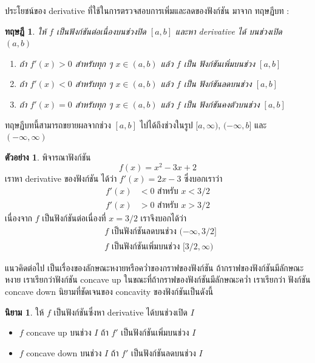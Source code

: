 \documentclass[
]{book}
\newtheorem{theorem}{ทฤษฎี}[chapter]
\theoremstyle{definition}
\newtheorem{definition}{นิยาม}[chapter]
\theoremstyle{definition}
\newtheorem{example}{ตัวอย่าง}[chapter]
\theoremstyle{definition}
\theoremstyle{definition}
\theoremstyle{remark}
\begin{document}
ประโยชน์ของ derivative ที่ใช้ในการตรวจสอบการเพิ่มและลดของฟังก์ชัน มาจาก ทฤษฏีบท :

\begin{theorem}

ให้ \(f\) เป็นฟังก์ชันต่อเนื่องบนช่วงปิด \([a,b]\) และหา derivative ได้ บนช่วงเปิด
\((a,b)\)

\begin{enumerate}
\def\labelenumi{\arabic{enumi}.}
\item
  ถ้า \(f'(x) > 0\) สำหรับทุก ๆ \(x \in (a,b)\) แล้ว \(f\) เป็น ฟังก์ชันเพิ่มบนช่วง
  \([a,b]\)
\item
  ถ้า \(f'(x) < 0\) สำหรับทุก ๆ \(x \in (a,b)\) แล้ว \(f\) เป็น ฟังก์ชันลดบนช่วง
  \([a,b]\)
\item
  ถ้า \(f'(x) = 0\) สำหรับทุก ๆ \(x \in (a,b)\) แล้ว \(f\) เป็น ฟังก์ชันคงตัวบนช่วง
  \([a,b]\)
\end{enumerate}

\end{theorem}

ทฤษฏีบทนี้สามารถขยายผลจากช่วง \([a,b]\) ไปได้ถึงช่วงในรูป \([a,\infty)\),
\((-\infty,b]\) และ \((-\infty,\infty)\)

\begin{example}
พิจารณาฟังก์ชัน \[f(x) = x^2-3x+2\] เราหา derivative ของฟังก์ชัน ได้ว่า
\(f'(x) = 2x-3\) ซึ่งบอกเราว่า \begin{equation}   \begin{aligned}
    f'(x) &< 0 \text{ สำหรับ $x < 3/2$} \\
    f'(x) &> 0 \text{ สำหรับ $x > 3/2$}
  \end{aligned} \end{equation} เนื่องจาก \(f\) เป็นฟังก์ชันต่อเนื่องที่ \(x=3/2\)
เราจึงบอกได้ว่า \begin{equation}   \begin{aligned}
    \text{ $f$ เป็นฟังก์ชันลดบนช่วง $(-\infty,3/2]$} \\
    \text{ $f$ เป็นฟังก์ชันเพิ่มบนช่วง $[3/2,\infty)$}
  \end{aligned} \end{equation}
\end{example}

แนวคิดต่อไป เป็นเรื่องของลักษณะหงายหรือคว่ำของกราฟของฟังก์ชัน
ถ้ากราฟของฟังก์ชันมีลักษณะหงาย เราเรียกว่าฟังก์ชัน concave up
ในขณะที่ถ้ากราฟของฟังก์ชันมีลักษณะคว่ำ เราเรียกว่า ฟังก์ชัน concave down นิยามที่ชัดเจนของ
concavity ของฟังก์ชันเป็นดังนี้

\begin{definition}

ให้ \(f\) เป็นฟังก์ชันซึ่งหา derivative ได้บนช่วงเปิด \(I\)

\begin{itemize}
\item
  \(f\) concave up บนช่วง \(I\) ถ้า \(f'\) เป็นฟังก์ชันเพิ่มบนช่วง \(I\)
\item
  \(f\) concave down บนช่วง \(I\) ถ้า \(f'\) เป็นฟังก์ชันลดบนช่วง \(I\)
\end{itemize}

\end{definition}
\end{document}
